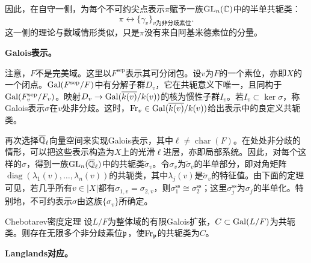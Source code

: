 因此，在自守一侧，为每个不可约尖点表示$\pi$赋予一族$\operatorname{GL}_n(\mathbb{C})$中的半单共轭类：
\[\pi\longleftrightarrow\{\gamma_v\}_{v\text{为非分歧素位}}.\]
这一侧的理论与数域情形类似，只是$\pi$没有来自阿基米德素位的分量。

\textbf{Galois表示。}

注意，$F$不是完美域。这里以$F^{\mathrm{sep}}$表示其可分闭包。设$v$为$F$的一个素位，亦即$X$的一个闭点。$\operatorname{Gal}(F^{\mathrm{sep}}/F)$中有分解子群$D_v$，它在共轭意义下唯一，且同构于$\operatorname{Gal}(F_v^{\mathrm{sep}}/F_v)$。映射$D_v\to\operatorname{Gal}(\overline{k(v)}/k(v))$的核为惯性子群$I_v$。若$I_v\subset\ker\sigma$，称Galois表示$\sigma$在$v$处非分歧。这时，$\mathrm{Fr}_v\in\operatorname{Gal}(\overline{k(v)}/k(v))$给出表示中的良定义共轭类。

再次选择$\overline{\mathbb{Q}}_\ell$向量空间来实现Galois表示，其中$\ell\ne\operatorname{char}(F)$。在处处非分歧的情形，可以把这些表示构造为$X$上的光滑$\ell$进层，亦即局部系统。因此，对每个这样的$\sigma$，得到一族$\operatorname{GL}_n(\overline{\mathbb{Q}}_\ell)$中的共轭类$\widetilde\sigma_v$。令$\sigma_v$为$\widetilde\sigma_v$的半单部分，即对角矩阵$\operatorname{diag}(\lambda_1(v),\ldots,\lambda_n(v))$的共轭类，其中$\lambda_j(v)$是$\widetilde\sigma_v$的特征值。由下面的定理可见，若几乎所有$v\in|X|$都有$\sigma_{1,v}=\sigma_{2,v}$，则$\sigma_1^{\mathrm{ss}}\cong\sigma_2^{\mathrm{ss}}$；这里$\sigma_j^{\mathrm{ss}}$为$\sigma_j$的半单化。特别地，不可约表示$\sigma$由这族$\{\sigma_v\}$所确定。
\begin{theorem}{Chebotarev密度定理}\label{L9S2O3}
设$L/F$为整体域的有限Galois扩张，$C\subset\operatorname{Gal}(L/F)$为共轭类。则存在无限多个非分歧素位$\mathfrak{p}$，使$\mathrm{Fr}_{\mathfrak{p}}$的共轭类为$C$。
\end{theorem}
\textbf{Langlands对应。}

